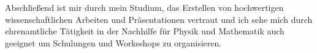\documentclass[11pt,a4paper,roman]{moderncv}
\begin{document}
Abschließend ist mir durch mein Studium, das Erstellen von hochwertigen wissenschaftlichen Arbeiten und Präsentationen vertraut und ich sehe mich durch  ehrenamtliche Tätigkeit in der Nachhilfe für Physik und Mathematik auch geeignet um Schulungen und Worksshops zu organisieren.\\


\makeletterclosing
\end{document}
